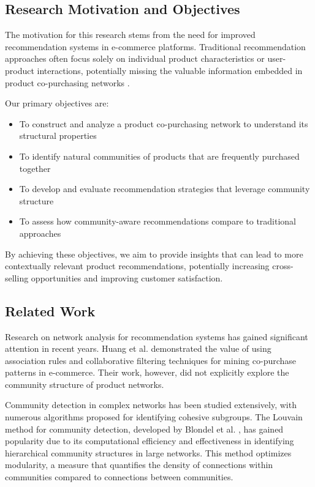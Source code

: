 \documentclass[conference]{IEEEtran}
\begin{document}
\subsection{Research Motivation and Objectives}
The motivation for this research stems from the need for improved recommendation systems in e-commerce platforms. Traditional recommendation approaches often focus solely on individual product characteristics or user-product interactions, potentially missing the valuable information embedded in product co-purchasing networks \cite{sarwar2001item}.

Our primary objectives are:
\begin{itemize}
    \item To construct and analyze a product co-purchasing network to understand its structural properties
    \item To identify natural communities of products that are frequently purchased together
    \item To develop and evaluate recommendation strategies that leverage community structure
    \item To assess how community-aware recommendations compare to traditional approaches
\end{itemize}

By achieving these objectives, we aim to provide insights that can lead to more contextually relevant product recommendations, potentially increasing cross-selling opportunities and improving customer satisfaction.

\subsection{Related Work}
Research on network analysis for recommendation systems has gained significant attention in recent years. Huang et al. \cite{huang2007applying} demonstrated the value of using association rules and collaborative filtering techniques for mining co-purchase patterns in e-commerce. Their work, however, did not explicitly explore the community structure of product networks.

Community detection in complex networks has been studied extensively, with numerous algorithms proposed for identifying cohesive subgroups. The Louvain method for community detection, developed by Blondel et al. \cite{blondel2008fast}, has gained popularity due to its computational efficiency and effectiveness in identifying hierarchical community structures in large networks. This method optimizes modularity, a measure that quantifies the density of connections within communities compared to connections between communities.
\end{document}

